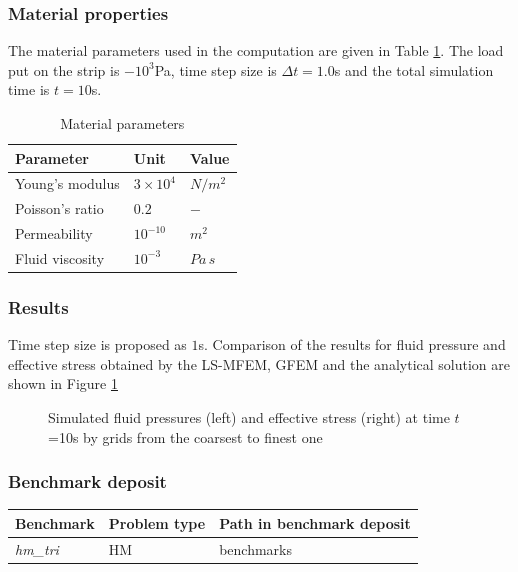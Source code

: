 \subsubsection*{Material properties}
The material
parameters used in the computation are given in Table
\ref{ex1_TableHM1}. The load put on the strip is $-10^3$Pa, time step
size is $\Delta t=1.0$s and the total simulation time is $t=10$s.

\begin{table}[h]
\centering
  \begin{tabular}{lll}
   \hline \hline
    Parameter & Unit & Value \\
   \hline
     Young's modulus & $3\times 10^{4}$  & $N/m^{2}$ \\
     Poisson's ratio & $0.2$             & $-$ \\
     Permeability    & $10^{-10}$        & $m^2$ \\
     Fluid viscosity & $10^{-3}$         & $Pa\,s$ \\
   \hline \hline
  \end{tabular}
  \caption{\label{ex1_TableHM1}Material parameters}
\end{table}
\subsubsection*{Results}
Time step size is proposed as $1$s.
Comparison of the results for fluid pressure and effective stress
obtained by the LS-MFEM, GFEM and the analytical solution are shown
in Figure \ref{ex1_fig1}
\begin{figure}[!htb]
  \begin{center}


  \end{center}
  \caption{Simulated fluid pressures (left) and effective stress (right)
  at time $t$=10s by grids from the coarsest to finest one}
  \label{ex1_fig1}
\end{figure}

\subsubsection*{Benchmark deposit}
\begin{tabular}{|l|l|l|}
  \hline
  Benchmark & Problem type & Path in benchmark deposit \\
  \hline
 \emph{hm\_tri}& HM & benchmarks\verb \HM\ \\
  \hline
\end{tabular}
